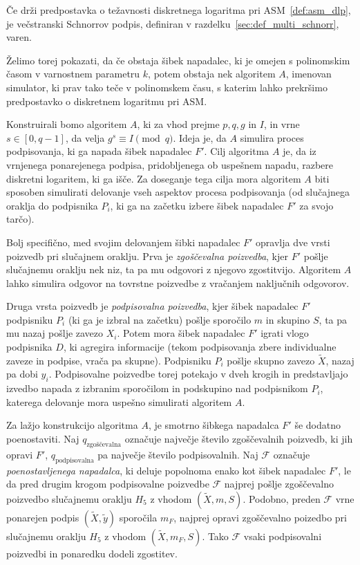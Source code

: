 \documentclass[isrm2, tisk]{fmfdelo}
\begin{document}
\begin{izrek}
    Če drži predpostavka o težavnosti diskretnega logaritma pri ASM~\ref{def:asm_dlp}, je večstranski 
    Schnorrov podpis, definiran v razdelku~\ref{sec:def_multi_schnorr}, varen.
\end{izrek}

Želimo torej pokazati, da če obstaja šibek napadalec, ki je omejen s polinomskim časom v varnostnem
parametru $k$, potem obstaja nek algoritem $A$, imenovan simulator, ki prav tako teče v polinomskem
času, s katerim lahko prekršimo predpostavko o diskretnem logaritmu pri ASM.

Konstruirali bomo algoritem $A$, ki za vhod prejme $p, q, g$ in $I$, in vrne $s \in [0, q - 1]$,
da velja $g^s \equiv I \pmod q$. Ideja je, da $A$ simulira proces podpisovanja, ki ga napada šibek
napadalec $F'$. Cilj algoritma $A$ je, da iz vrnjenega ponarejenega podpisa, pridobljenega ob
uspešnem napadu, razbere diskretni logaritem, ki ga išče. Za doseganje tega cilja mora algoritem $A$
biti sposoben simulirati delovanje vseh aspektov procesa podpisovanja (od slučajnega oraklja do
podpisnika $P_i$, ki ga na začetku izbere šibek napadalec $F'$ za svojo tarčo).

Bolj specifično, med svojim delovanjem šibki napadalec $F'$ opravlja dve vrsti poizvedb pri slučajnem
oraklju. Prva je \textit{zgoščevalna poizvedba}, kjer $F'$ pošlje slučajnemu oraklju nek niz, ta pa
mu odgovori z njegovo zgostitvijo. Algoritem $A$ lahko simulira odgovor na tovrstne poizvedbe z vračanjem
naključnih odgovorov.

Druga vrsta poizvedb je \textit{podpisovalna poizvedba}, kjer šibek napadalec $F'$ podpisniku $P_i$
(ki ga je izbral na začetku) pošlje sporočilo $m$ in skupino $S$, ta pa mu nazaj pošlje zavezo $X_i$.
Potem mora šibek napadalec $F'$ igrati vlogo podpisnika $D$, ki agregira informacije (tekom podpisovanja
zbere individualne zaveze in podpise, vrača pa skupne). Podpisniku $P_i$ pošlje skupno zavezo
$\tilde{X}$, nazaj pa dobi $y_i$. Podpisovalne poizvedbe torej potekajo v dveh krogih in predstavljajo
izvedbo napada z izbranim sporočilom in podskupino nad podpisnikom $P_i$, katerega delovanje mora
uspešno simulirati algoritem $A$.

Za lažjo konstrukcijo algoritma $A$, je smotrno šibkega napadalca $F'$ še dodatno poenostaviti. Naj
$q_{\text{zgoščevalna}}$ označuje največje število zgoščevalnih poizvedb, ki jih opravi $F'$,
$q_{\text{podpisovalna}}$ pa največje število podpisovalnih. Naj $\mathcal{F}$ označuje
\textit{poenostavljenega napadalca}, ki deluje popolnoma enako kot šibek napadalec $F'$, le da pred
drugim krogom podpisovalne poizvedbe $\mathcal{F}$ najprej pošlje zgoščevalno poizvedbo slučajnemu
oraklju $H_5$ z vhodom $(\tilde{X}, m, S)$. Podobno, preden $\mathcal{F}$ vrne ponarejen podpis
$(\tilde{X}, \tilde{y})$ sporočila $m_F$, najprej opravi zgoščevalno poizedbo pri slučajnemu oraklju
$H_5$ z vhodom $(\tilde{X}, m_F, S)$. Tako $\mathcal{F}$ vsaki podpisovalni poizvedbi in ponaredku
dodeli zgostitev.
\end{document}
